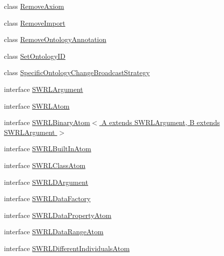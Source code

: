 \begin{DoxyCompactItemize}
\item 
class \hyperlink{classorg_1_1semanticweb_1_1owlapi_1_1model_1_1_remove_axiom}{Remove\-Axiom}
\item 
class \hyperlink{classorg_1_1semanticweb_1_1owlapi_1_1model_1_1_remove_import}{Remove\-Import}
\item 
class \hyperlink{classorg_1_1semanticweb_1_1owlapi_1_1model_1_1_remove_ontology_annotation}{Remove\-Ontology\-Annotation}
\item 
class \hyperlink{classorg_1_1semanticweb_1_1owlapi_1_1model_1_1_set_ontology_i_d}{Set\-Ontology\-I\-D}
\item 
class \hyperlink{classorg_1_1semanticweb_1_1owlapi_1_1model_1_1_specific_ontology_change_broadcast_strategy}{Specific\-Ontology\-Change\-Broadcast\-Strategy}
\item 
interface \hyperlink{interfaceorg_1_1semanticweb_1_1owlapi_1_1model_1_1_s_w_r_l_argument}{S\-W\-R\-L\-Argument}
\item 
interface \hyperlink{interfaceorg_1_1semanticweb_1_1owlapi_1_1model_1_1_s_w_r_l_atom}{S\-W\-R\-L\-Atom}
\item 
interface \hyperlink{interfaceorg_1_1semanticweb_1_1owlapi_1_1model_1_1_s_w_r_l_binary_atom_3_01_a_01extends_01_s_w_rc30c5b4d74ec2b23e92d0d06ccd24e5f}{S\-W\-R\-L\-Binary\-Atom$<$ A extends S\-W\-R\-L\-Argument, B extends S\-W\-R\-L\-Argument $>$}
\item 
interface \hyperlink{interfaceorg_1_1semanticweb_1_1owlapi_1_1model_1_1_s_w_r_l_built_in_atom}{S\-W\-R\-L\-Built\-In\-Atom}
\item 
interface \hyperlink{interfaceorg_1_1semanticweb_1_1owlapi_1_1model_1_1_s_w_r_l_class_atom}{S\-W\-R\-L\-Class\-Atom}
\item 
interface \hyperlink{interfaceorg_1_1semanticweb_1_1owlapi_1_1model_1_1_s_w_r_l_d_argument}{S\-W\-R\-L\-D\-Argument}
\item 
interface \hyperlink{interfaceorg_1_1semanticweb_1_1owlapi_1_1model_1_1_s_w_r_l_data_factory}{S\-W\-R\-L\-Data\-Factory}
\item 
interface \hyperlink{interfaceorg_1_1semanticweb_1_1owlapi_1_1model_1_1_s_w_r_l_data_property_atom}{S\-W\-R\-L\-Data\-Property\-Atom}
\item 
interface \hyperlink{interfaceorg_1_1semanticweb_1_1owlapi_1_1model_1_1_s_w_r_l_data_range_atom}{S\-W\-R\-L\-Data\-Range\-Atom}
\item 
interface \hyperlink{interfaceorg_1_1semanticweb_1_1owlapi_1_1model_1_1_s_w_r_l_different_individuals_atom}{S\-W\-R\-L\-Different\-Individuals\-Atom}

\end{DoxyCompactItemize}
